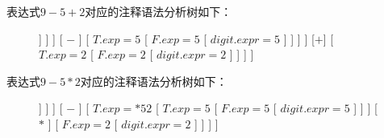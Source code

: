 \documentclass[UTF8,noindent]{ctexart}
\begin{document}
表达式$9-5+2$对应的注释语法分析树如下：
\begin{figure}[H]
  \centering
  \begin{forest}
	[{$E.exp = +-952$}
	  [{$E.exp = -95$}
		[
		  {$E.exp = 9$}
		  [
			{$T.exp = 9$}
			[
			  {$F.exp = 9$}
			  [
				{$digit.expr = 9$}
			  ]
			]
		  ]
		]
		[
		  {$-$}
		]
		[
		  {$T.exp = 5$}
		  [
			{$F.exp = 5$}
			[
			  {$digit.expr = 5$}
			]
		  ]
		]
	  ]
	  [{$+$}]
	  [
		{$T.exp = 2$}
		[
		  {$F.exp  = 2$}
		  [
			{$digit.expr = 2$}
		  ]
		]
	  ]
	]
  \end{forest}
\end{figure}

表达式$9-5*2$对应的注释语法分析树如下：
\begin{figure}[H]
  \centering
  \begin{forest}
	[
	  {$E.exp = -9*52$}
	  [
		{$E.exp =9$}
		[
		  {$T.exp = 9$}
		  [
			{$F.exp = 9$}
			[
			  {$digit.expr = 9$}
			]
		  ]
		]
	  ]
	  [
		{$-$}
	  ]
	  [
		{$T.exp = *52$}
		[
		  {$T.exp = 5$}
		  [
			{$F.exp = 5$}
			[
			  {$digit.expr = 5$}
			]
		  ]
		]
		[
		  {$*$}
		]
		[
		  {$F.exp = 2$}
		  [
			{$digit.expr = 2$}
		  ]
		]
	  ]
	]
  \end{forest}
\end{figure}
\end{document}

